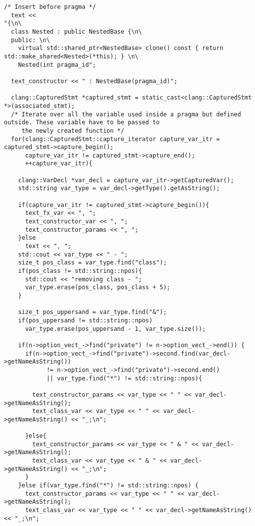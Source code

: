 \documentclass[a4paper,10pt,twoside]{book}
\begin{document}
\begin{lstlisting}[language=CCC, caption=driver/program.cpp]
/* Insert before pragma */
  text <<
"{\n\
  class Nested : public NestedBase {\n\
  public: \n\
    virtual std::shared_ptr<NestedBase> clone() const { return std::make_shared<Nested>(*this); } \n\
    Nested(int pragma_id";

  text_constructor << " : NestedBase(pragma_id)";

  clang::CapturedStmt *captured_stmt = static_cast<clang::CapturedStmt *>(associated_stmt);
  /* Iterate over all the variable used inside a pragma but defined outside. These variable have to be passed to
     the newly created function */ 
  for(clang::CapturedStmt::capture_iterator capture_var_itr = captured_stmt->capture_begin(); 
      capture_var_itr != captured_stmt->capture_end(); 
      ++capture_var_itr){

    clang::VarDecl *var_decl = capture_var_itr->getCapturedVar(); 
    std::string var_type = var_decl->getType().getAsString();

    if(capture_var_itr != captured_stmt->capture_begin()){
      text_fx_var << ", ";
      text_constructor_var << ", ";
      text_constructor_params << ", ";
    }else
      text << ", ";
    std::cout << var_type << " - ";
    size_t pos_class = var_type.find("class");
    if(pos_class != std::string::npos){
      std::cout << "removing class - ";
      var_type.erase(pos_class, pos_class + 5);
    }
    
    size_t pos_uppersand = var_type.find("&");
    if(pos_uppersand != std::string::npos)
      var_type.erase(pos_uppersand - 1, var_type.size());

    if(n->option_vect_->find("private") != n->option_vect_->end()) {
      if(n->option_vect_->find("private")->second.find(var_decl->getNameAsString()) 
            != n->option_vect_->find("private")->second.end() 
            || var_type.find("*") != std::string::npos){

        text_constructor_params << var_type << " " << var_decl->getNameAsString();
        text_class_var << var_type << " " << var_decl->getNameAsString() << "_;\n";

      }else{
        text_constructor_params << var_type << " & " << var_decl->getNameAsString();
        text_class_var << var_type << " & " << var_decl->getNameAsString() << "_;\n";
      }
    }else if(var_type.find("*") != std::string::npos) {
      text_constructor_params << var_type << " " << var_decl->getNameAsString();
      text_class_var << var_type << " " << var_decl->getNameAsString() << "_;\n";


\end{lstlisting}
\end{document}
